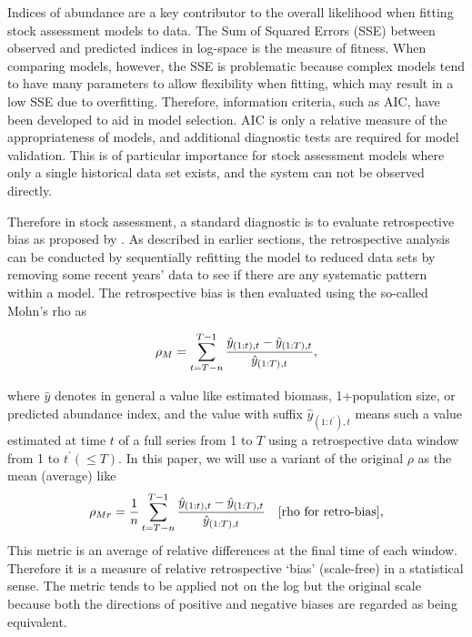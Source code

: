 Indices of abundance are a key contributor to the overall likelihood when fitting stock assessment models to data. The Sum of Squared Errors (SSE) between observed and predicted indices in log-space is the measure of fitness. When comparing models, however, the SSE is problematic because complex models tend to have many parameters to allow flexibility when fitting, which may result in a low SSE due to overfitting. Therefore, information criteria, such as AIC, have been developed to aid in model selection. AIC is only a relative measure of the appropriateness of models, and additional diagnostic tests are required for model validation. This is of particular importance for stock assessment models where only a single historical data set exists, and the system can not be observed directly.

Therefore in stock assessment, a standard diagnostic is to evaluate retrospective bias as proposed by \cite{mohn1999retrospectyive}. As described in earlier sections, the retrospective analysis can be conducted by sequentially refitting the model to reduced data sets by removing some recent years' data to see if there are any systematic pattern within a model. The retrospective bias is then evaluated using the so-called Mohn's rho as 

\begin{equation}
\label{eqn:mohn0}
\rho_M = \displaystyle \sum_{t=T-n}^{T-1} \frac{\hat{y}_{(1:t),t}-\hat{y}_{(1:T),t}}{\hat{y}_{(1:T),t}}, 
\end{equation}

where $\hat{y}$ denotes in general a value like estimated biomass, 1+population size, or predicted abundance index, and the value with suffix $\hat{y}_{(1:t^\prime),t}$ means such a value estimated at time $t$ of a full series from 1 to $T$ using a retrospective data window from 1 to $t^\prime (\leq T)$. In this paper, we will use a variant of the original $\rho$ as the mean (average) like 
\begin{equation}
\label{eqn:mohn}
\rho_{Mr} = \displaystyle \frac{1}{n} \sum_{t=T-n}^{T-1} \frac{\hat{y}_{(1:t),t}-\hat{y}_{(1:T),t}}{\hat{y}_{(1:T),t}} 
\quad \mbox{[rho for retro-bias]}, 
\end{equation}
This metric is an average of relative differences at the final time of each window. Therefore it is a measure of relative retrospective `bias' (scale-free) in a statistical sense. The metric tends to be applied not on the log but the original scale because both the directions of positive and negative biases are regarded as being equivalent. 

